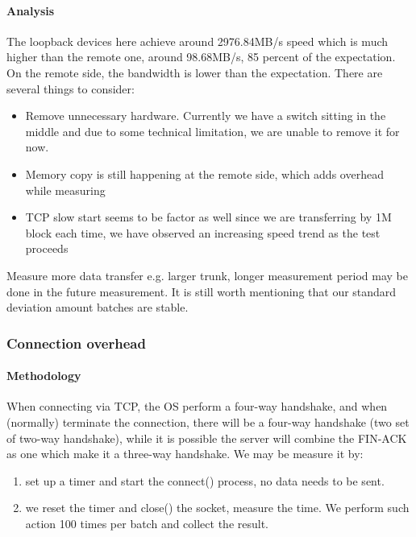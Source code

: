 \paragraph{Analysis}

The loopback devices here achieve around 2976.84MB/s speed which is much higher than the remote one, around 98.68MB/s, 85 percent of the expectation. On the remote side, the bandwidth is lower than the expectation. There are several things to consider: 

\begin{itemize}
    \item Remove unnecessary hardware. Currently we have a switch sitting in the middle and due to some technical limitation, we are unable to remove it for now.
    \item Memory copy is still happening at the remote side, which adds overhead while measuring
    \item TCP slow start seems to be factor as well since we are transferring by 1M block each time, we have observed an increasing speed trend as the test proceeds
\end{itemize}

Measure more data transfer e.g. larger trunk, longer measurement period may be done in the future measurement. It is still worth mentioning that our standard deviation amount batches are stable. 

\subsubsection{Connection overhead} 


\paragraph{Methodology}

When connecting via TCP, the OS perform a four-way handshake, and when (normally) terminate the connection, there will be a four-way handshake (two set of two-way handshake), while it is possible the server will combine the FIN-ACK as one which make it a three-way handshake. We may be measure it by:

\begin{enumerate}
    \item set up a timer and start the connect() process, no data needs to be sent. 
    \item we reset the timer and close() the socket, measure the time. We perform such action 100 times per batch and collect the result.
\end{enumerate}

